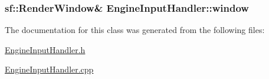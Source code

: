 \subsubsection[{window}]{\setlength{\rightskip}{0pt plus 5cm}sf\+::\+Render\+Window\& Engine\+Input\+Handler\+::window\hspace{0.3cm}{\ttfamily [private]}}\label{class_engine_input_handler_ae534eb94ba995a38f87faf37ed309ba5}


The documentation for this class was generated from the following files\+:\begin{DoxyCompactItemize}
\item 
\hyperlink{_engine_input_handler_8h}{Engine\+Input\+Handler.\+h}\item 
\hyperlink{_engine_input_handler_8cpp}{Engine\+Input\+Handler.\+cpp}\end{DoxyCompactItemize}
